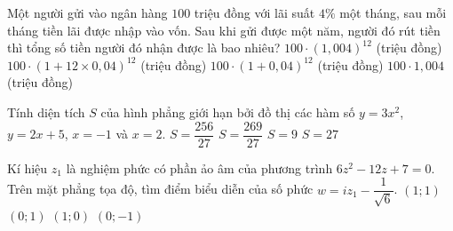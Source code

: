\begin{ex}%
	Một người gửi vào ngân hàng $100$ triệu đồng với lãi suất $4\%$ một tháng, sau mỗi tháng tiền lãi được nhập vào vốn. Sau khi gửi được một năm, người đó rút tiền thì tổng số tiền người đó nhận được là bao nhiêu?
	\choice
	{$100\cdot(1,004)^{12}$ (triệu đồng)}
	{$100\cdot(1+12\times 0,04)^{12}$ (triệu đồng)}
	{\True $100\cdot(1+0,04)^{12}$ (triệu đồng)}
	{$100\cdot 1,004$ (triệu đồng)}
\end{ex}

\begin{ex}%
	Tính diện tích $S$ của hình phẳng giới hạn bởi đồ thị các hàm số $y=3x^2$, $y=2x+5$, $x=-1$ và $x=2$.
	\choice
	{$S=\dfrac{256}{27}$}
	{\True $S=\dfrac{269}{27}$}
	{$S=9$}
	{$S=27$}
\end{ex}

\begin{ex}%
	Kí hiệu $z_1$ là nghiệm phức có phần ảo âm của phương trình $6z^2-12z+7=0$. Trên mặt phẳng tọa độ, tìm điểm biểu diễn của số phức $w=iz_1-\dfrac{1}{\sqrt{6}}$.
	\choice
	{$(1;1) $}
	{\True $(0;1) $}
	{$(1;0) $}
	{$(0;-1) $}
	\loigiai{
		Ta có: $6z^2-12z+7=0\Leftrightarrow \left[\begin{aligned}& z=1+\dfrac{\sqrt{6}}{6}i \\
		& z=1-\dfrac{\sqrt{6}}{6}i 
		\end{aligned}\right.$.\\
		$w=iz_1-\dfrac{1}{\sqrt{6}}=i\left({1-\dfrac{\sqrt{6}}{6}i}\right)-\dfrac{1}{\sqrt{6}}=i=0+1\cdot i$. Điểm biểu diễn số phức $w$ là $(0;1)$.
	}
\end{ex}

